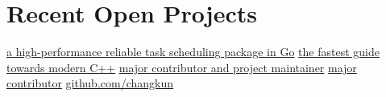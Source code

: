 \section{\textbf{Recent Open Projects}}
  \resumeSubHeadingListStart
      {\href{https://github.com/changkun/goscheduler}{a high-performance reliable task scheduling package in Go}}
      {\href{https://github.com/changkun/modern-cpp-tutorial}{the fastest guide towards modern C++}}
      {\href{http://github.com/xitu/tensorflow-docs/}{major contributor and project maintainer}}
      {\href{http://github.com/xitu/gold-minder/}{major contributor}}
      {\href{https://github.com/changkun/}{github.com/changkun}}
  \resumeSubHeadingListEnd